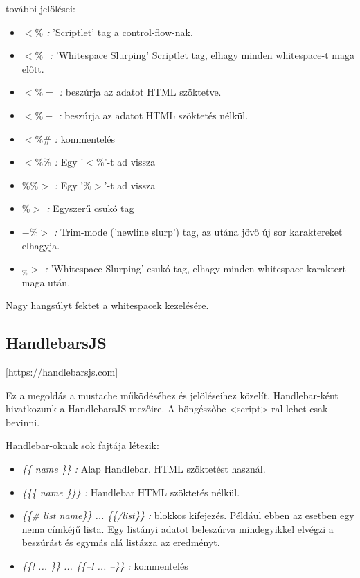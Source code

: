 további jelölései:
\begin{itemize}
\item \emph{$<\%$ :} 'Scriptlet' tag a control-flow-nak.
\item \emph{$<\%\_$ :} 'Whitespace Slurping' Scriptlet tag, elhagy minden whitespace-t maga előtt.
\item \emph{$<\%=$ :} beszúrja az adatot HTML szöktetve.
\item \emph{$<\%-$ :} beszúrja az adatot HTML szöktetés nélkül.
\item \emph{$<\%\#$ :} kommentelés
\item \emph{$<\%\%$ :} Egy '$<\%$'-t ad vissza
\item \emph{$\%\%>$ :} Egy '$\%>$'-t ad vissza
\item \emph{$\%>$ :} Egyszerű csukó tag
\item \emph{$-\%>$ :} Trim-mode ('newline slurp') tag, az utána jövő új sor karaktereket elhagyja.
\item \emph{$_\%>$ :} 'Whitespace Slurping' csukó tag, elhagy minden whitespace karaktert maga után.
\end{itemize}

Nagy hangsúlyt fektet a whitespacek kezelésére.


\subsection{HandlebarsJS}
[https://handlebarsjs.com]

Ez a megoldás a mustache működéséhez és jelöléseihez közelít.
Handlebar-ként hivatkozunk a HandlebarsJS mezőire.
A böngészőbe <script>-ral lehet csak bevinni. 


Handlebar-oknak sok fajtája létezik:
\begin{itemize}
\item \emph{\{\{ name \}\} :} 
Alap Handlebar.
HTML szöktetést használ.
\item \emph{\{\{\{ name \}\}\} :} 
Handlebar HTML szöktetés nélkül.
\item \emph{\{\{\# list name\}\} ... \{\{/list\}\} :} 
blokkos kifejezés.
Például ebben az esetben egy nema címkéjű lista.
Egy listányi adatot beleszúrva mindegyikkel elvégzi a beszúrást és egymás alá listázza az eredményt.
\item \emph{\{\{! ... \}\} ... \{\{--! ... --\}\} :} kommentelés
\end{itemize}


